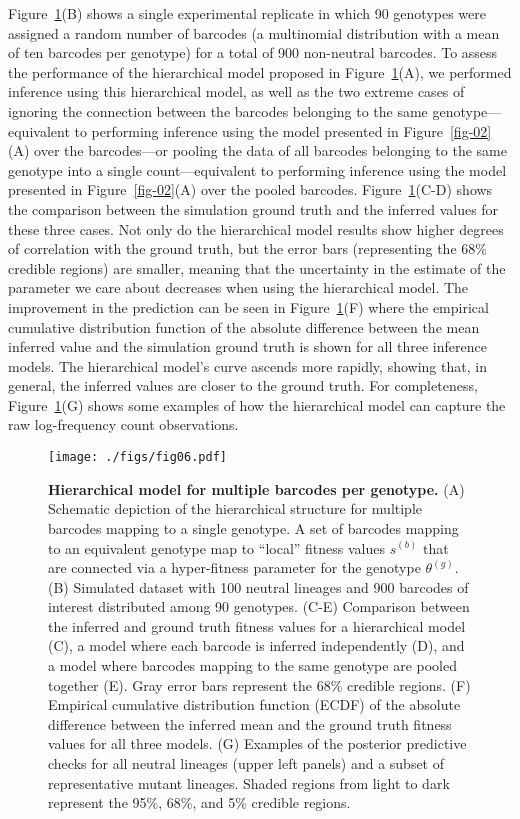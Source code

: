\documentclass[
  letterpaper,
  DIV=11,
  numbers=noendperiod]{scrartcl}
\begin{document}
\begin{refsegment}
Figure~\ref{fig-06}(B) shows a single experimental replicate in which 90
genotypes were assigned a random number of barcodes (a multinomial
distribution with a mean of ten barcodes per genotype) for a total of
900 non-neutral barcodes. To assess the performance of the hierarchical
model proposed in Figure~\ref{fig-06}(A), we performed inference using
this hierarchical model, as well as the two extreme cases of ignoring
the connection between the barcodes belonging to the same
genotype---equivalent to performing inference using the model presented
in Figure~\ref{fig-02}(A) over the barcodes---or pooling the data of all
barcodes belonging to the same genotype into a single count---equivalent
to performing inference using the model presented in
Figure~\ref{fig-02}(A) over the pooled barcodes.
Figure~\ref{fig-06}(C-D) shows the comparison between the simulation
ground truth and the inferred values for these three cases. Not only do
the hierarchical model results show higher degrees of correlation with
the ground truth, but the error bars (representing the 68\% credible
regions) are smaller, meaning that the uncertainty in the estimate of
the parameter we care about decreases when using the hierarchical model.
The improvement in the prediction can be seen in Figure~\ref{fig-06}(F)
where the empirical cumulative distribution function of the absolute
difference between the mean inferred value and the simulation ground
truth is shown for all three inference models. The hierarchical model's
curve ascends more rapidly, showing that, in general, the inferred
values are closer to the ground truth. For completeness,
Figure~\ref{fig-06}(G) shows some examples of how the hierarchical model
can capture the raw log-frequency count observations.

\begin{figure}

{\centering \texttt{[image: ./figs/fig06.pdf]}

}

\caption{\label{fig-06}\textbf{Hierarchical model for multiple barcodes
per genotype.} (A) Schematic depiction of the hierarchical structure for
multiple barcodes mapping to a single genotype. A set of barcodes
mapping to an equivalent genotype map to ``local'' fitness values
\(s^{(b)}\) that are connected via a hyper-fitness parameter for the
genotype \(\theta^{(g)}\). (B) Simulated dataset with 100 neutral
lineages and 900 barcodes of interest distributed among 90 genotypes.
(C-E) Comparison between the inferred and ground truth fitness values
for a hierarchical model (C), a model where each barcode is inferred
independently (D), and a model where barcodes mapping to the same
genotype are pooled together (E). Gray error bars represent the 68\%
credible regions. (F) Empirical cumulative distribution function (ECDF)
of the absolute difference between the inferred mean and the ground
truth fitness values for all three models. (G) Examples of the posterior
predictive checks for all neutral lineages (upper left panels) and a
subset of representative mutant lineages. Shaded regions from light to
dark represent the 95\%, 68\%, and 5\% credible regions.}


\end{figure}
\end{refsegment}
\end{document}
